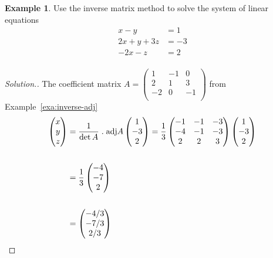 \documentclass[11pt,a4paper]{article}
\theoremstyle{definition}
\newtheorem{exa}[thm]{Example}
\newenvironment{solution}
  {\renewcommand{\qedsymbol}{}\begin{proof}[\textit{Solution}.]}
  {\end{proof}}
\begin{document}
\begin{exa}
Use the inverse matrix method to solve the system of linear equations
\begin{align*}
x-y&=1\\2x+y+3z&=-3\\-2x-z&=2\\
\end{align*}
\end{exa}
\begin{solution}
 The coefficient matrix $A=
\begin{pmatrix}
1&-1&0\\2&1&3\\-2&0&-1\\
\end{pmatrix} 
 $ from Example~\ref{exa:inverse-adj}
\begin{align*}
\begin{pmatrix}
x\\y\\z\\
\end{pmatrix}
&=\frac{1}{\det A}\hspace{0.1cm}.\hspace{0.1cm}\text{adj}A
\begin{pmatrix}
1\\-3\\2\\
\end{pmatrix}
=\frac{1}{3}
\begin{pmatrix}
-1&-1&-3\\-4&-1&-3\\2&2&3\\
\end{pmatrix}
\begin{pmatrix}
1\\-3\\2\\
\end{pmatrix}\\\\
&=\frac{1}{3}
\begin{pmatrix}
-4\\-7\\2\\
\end{pmatrix}\\\\
&=
\begin{pmatrix}
-4/3\\-7/3\\2/3\\
\end{pmatrix}\\
\end{align*}
\end{solution}
\end{document}
